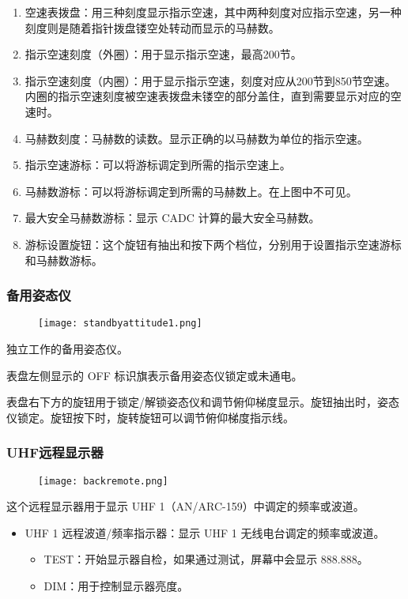 \begin{enumerate}
  \item 空速表拨盘：用三种刻度显示指示空速，其中两种刻度对应指示空速，另一种刻度则是随着指针拨盘镂空处转动而显示的马赫数。
  \item 指示空速刻度（外圈）：用于显示指示空速，最高200节。
  \item 指示空速刻度（内圈）：用于显示指示空速，刻度对应从200节到850节空速。内圈的指示空速刻度被空速表拨盘未镂空的部分盖住，直到需要显示对应的空速时。
  \item 马赫数刻度：马赫数的读数。显示正确的以马赫数为单位的指示空速。
  \item 指示空速游标：可以将游标调定到所需的指示空速上。
  \item 马赫数游标：可以将游标调定到所需的马赫数上。在上图中不可见。
  \item 最大安全马赫数游标：显示 CADC 计算的最大安全马赫数。
  \item 游标设置旋钮：这个旋钮有抽出和按下两个档位，分别用于设置指示空速游标和马赫数游标。
\end{enumerate}

\subsubsection{备用姿态仪}
\begin{figure}[htb]
  \center
  \texttt{[image: standbyattitude1.png]}
\end{figure}
独立工作的备用姿态仪。

表盘左侧显示的 OFF 标识旗表示备用姿态仪锁定或未通电。

表盘右下方的旋钮用于锁定/解锁姿态仪和调节俯仰梯度显示。旋钮抽出时，姿态仪锁定。旋钮按下时，旋转旋钮可以调节俯仰梯度指示线。

\subsubsection{UHF远程显示器}
\begin{figure}[htb]
  \center
  \texttt{[image: backremote.png]}
\end{figure}
这个远程显示器用于显示 UHF 1（AN/ARC-159）中调定的频率或波道。

\begin{itemize}
  \item UHF 1 远程波道/频率指示器：显示 UHF 1 无线电台调定的频率或波道。
  \begin{itemize}
    \item TEST：开始显示器自检，如果通过测试，屏幕中会显示 888.888。
    \item DIM：用于控制显示器亮度。
  \end{itemize}
\end{itemize}

